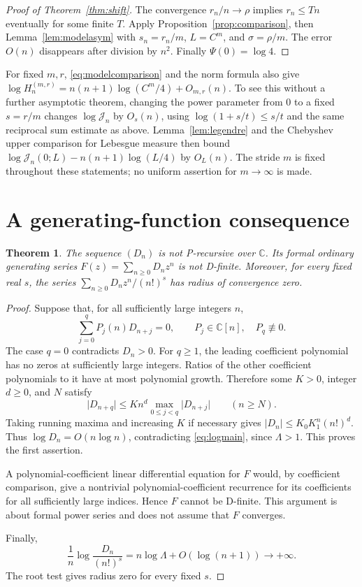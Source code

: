 \documentclass[11pt,a4paper]{article}
\numberwithin{equation}{section}
\newtheorem{theorem}{Theorem}[section]
\theoremstyle{remark}\newtheorem{remark}[theorem]{Remark}
\newcommand{\J}{\mathcal J}
\newcommand{\abs}[1]{\lvert#1\rvert}
\begin{document}
\begin{proof}[Proof of Theorem~\ref{thm:shift}]
The convergence $r_n/n\to\rho$ implies $r_n\leq Tn$ eventually for some
finite $T$. Apply Proposition~\ref{prop:comparison}, then
Lemma~\ref{lem:modelasym} with $s_n=r_n/m$, $L=C^m$, and
$\sigma=\rho/m$. The error $O(n)$ disappears after division by $n^2$.
Finally $\Psi(0)=\log4$.
\end{proof}

For fixed $m,r$, \eqref{eq:modelcomparison} and the norm formula also give
$\log H_n^{(m,r)}=n(n+1)\log(C^m/4)+O_{m,r}(n)$.
To see this without a further asymptotic theorem, changing the power parameter
from $0$ to a fixed $s=r/m$ changes $\log\J_n$ by $O_s(n)$, using
$\log(1+s/t)\leq s/t$ and the same reciprocal sum estimate as above.
Lemma~\ref{lem:legendre} and the Chebyshev upper comparison for Lebesgue
measure then bound $\log\J_n(0;L)-n(n+1)\log(L/4)$ by $O_L(n)$.
The stride $m$ is fixed throughout these statements; no uniform assertion for
$m\to\infty$ is made.

\section{A generating-function consequence}
\label{sec:dfinite}
\begin{theorem}\label{thm:nonrecursive}
The sequence $(D_n)$ is not P-recursive over $\mathbb C$. Its formal ordinary
generating series $F(z)=\sum_{n\geq0}D_nz^n$ is not D-finite.
Moreover, for every fixed real $s$, the series
$\sum_{n\geq0}D_n z^n/(n!)^s$ has radius of convergence zero.
\end{theorem}
\begin{proof}
Suppose that, for all sufficiently large integers $n$,
\begin{equation}\label{eq:prec}
 \sum_{j=0}^q P_j(n)D_{n+j}=0,
 \qquad P_j\in\mathbb C[n],\quad P_q\not\equiv0.
\end{equation}
The case $q=0$ contradicts $D_n>0$. For $q\geq1$, the leading coefficient
polynomial has no zeros at sufficiently large integers. Ratios of the other
coefficient polynomials to it have at most polynomial growth. Therefore
some $K>0$, integer $d\geq0$, and $N$ satisfy
\[
 \abs{D_{n+q}}\leq K n^d\max_{0\leq j<q}\abs{D_{n+j}}\qquad(n\geq N).
\]
Taking running maxima and increasing $K$ if necessary gives
$\abs{D_n}\leq K_0K_1^n(n!)^d$. Thus
$\log D_n=O(n\log n)$, contradicting \eqref{eq:logmain}, since $\Lambda>1$.
This proves the first assertion.

A polynomial-coefficient linear differential equation for $F$ would, by
coefficient comparison, give a nontrivial polynomial-coefficient recurrence
for its coefficients for all sufficiently large indices. Hence $F$ cannot
be D-finite. This argument is about formal power series and does not assume
that $F$ converges.

Finally,
\[
 \frac1n\log\frac{D_n}{(n!)^s}
 =n\log\Lambda+O(\log(n+1))\longrightarrow+\infty.
\]
The root test gives radius zero for every fixed $s$.
\end{proof}
\end{document}
